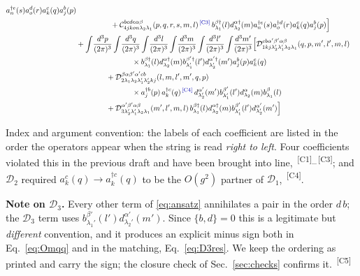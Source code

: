 \documentclass[11pt]{article}
\newcommand{\dg}{\dagger}
\newcommand{\ip}[1]{\int\!\frac{d^{3}#1}{(2\pi)^{3}}}
\newcommand{\C}{\mathcal{C}}
\newcommand{\D}{\mathcal{D}}
\newcommand{\chg}[1]{{\color{blue!70!black}\textsuperscript{\,[C#1]}}}
\begin{document}
{\begin{align}
a^{\dg e}_{n}(s)a^{d}_{o}(r)a^{c}_{k}(q)a^{b}_{j}(p)\nonumber\\
&\hspace{1.6cm}
+\C^{bcde\alpha\beta}_{4jkon\lambda_{2}\lambda_{1}}(p,q,r,s,m,l)\chg{3}\,
b^{\beta\dg}_{\lambda_{1}}(l)d^{\alpha\dg}_{\lambda_{2}}(m)
a^{\dg e}_{n}(s)a^{\dg d}_{o}(r)a^{c}_{k}(q)a^{b}_{j}(p)\Big]\nonumber\\
&+\ip{p}\ip{q}\ip{l}\ip{m}\ip{l'}\ip{m'}\Big[
\D^{cb\alpha'\beta'\alpha\beta}_{1kj\lambda_{2}'\lambda_{1}'\lambda_{2}\lambda_{1}}(q,p,m',l',m,l)
\nonumber\\&\hspace{2.6cm}\times
b^{\beta\dg}_{\lambda_{1}}(l)d^{\alpha\dg}_{\lambda_{2}}(m)
b^{\beta'\dg}_{\lambda_{1}'}(l')d^{\alpha'\dg}_{\lambda_{2}'}(m')a^{b}_{j}(p)a^{c}_{k}(q)\nonumber\\
&\hspace{1.4cm}
+\D^{\beta\alpha\beta'\alpha'cb}_{2\lambda_{1}\lambda_{2}\lambda_{1}'\lambda_{2}'kj}(l,m,l',m',q,p)
\nonumber\\&\hspace{2.6cm}\times
a^{\dg b}_{j}(p)\,a^{\dg c}_{k}(q)\chg{4}\,
d^{\alpha'}_{\lambda_{2}'}(m')b^{\beta'}_{\lambda_{1}'}(l')
d^{\alpha}_{\lambda_{2}}(m)b^{\beta}_{\lambda_{1}}(l)\nonumber\\
&\hspace{1.4cm}
+\D^{\alpha'\beta'\alpha\beta}_{3\lambda_{2}'\lambda_{1}'\lambda_{2}\lambda_{1}}(m',l',m,l)\,
b^{\beta\dg}_{\lambda_{1}}(l)d^{\alpha\dg}_{\lambda_{2}}(m)
b^{\beta'}_{\lambda_{1}'}(l')d^{\alpha'}_{\lambda_{2}'}(m')\Big]
\label{eq:ansatz}
\end{align}}

\noindent
Index and argument convention: the labels of each coefficient are listed in the order the
operators appear when the string is read \emph{right to left}. Four coefficients violated this in
the previous draft and have been brought into line, \chg{1}--\chg{3}; and $\D_{2}$ required
$a^{c}_{k}(q)\to a^{\dg c}_{k}(q)$ to be the $O(g^{2})$ partner of $\D_{1}$, \chg{4}.

\begin{addbox}
\textbf{Note on $\D_{3}$.} Every other term of \eqref{eq:ansatz} annihilates a pair in the order
$d\,b$; the $\D_{3}$ term uses $b^{\beta'}_{\lambda_{1}'}(l')d^{\alpha'}_{\lambda_{2}'}(m')$.
Since $\{b,d\}=0$ this is a legitimate but \emph{different} convention, and it produces an
explicit minus sign both in Eq.~\eqref{eq:Omqq} and in the matching, Eq.~\eqref{eq:D3res}. We
keep the ordering as printed and carry the sign; the closure check of
Sec.~\ref{sec:checks} confirms it. \chg{5}
\end{addbox}
\end{document}

